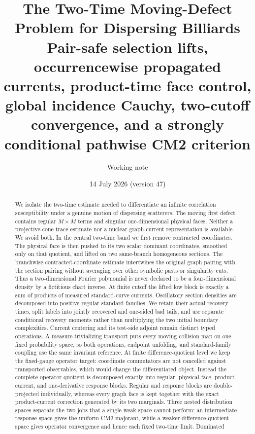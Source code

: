 \documentclass[11pt]{article}
\title{The Two-Time Moving-Defect Problem for Dispersing Billiards\\
\large Pair-safe selection lifts, occurrencewise propagated currents,
product-time face control,
global incidence Cauchy,
two-cutoff convergence, and a strongly conditional
pathwise CM2 criterion}
\author{Working note}
\date{14 July 2026 (version 47)}
\begin{document}
\maketitle

\begin{abstract}\sloppy
We isolate the two-time estimate needed to differentiate an infinite
correlation susceptibility under a genuine motion of dispersing scatterers.
The moving first defect contains regular $M\times M$ terms and singular
one-dimensional physical faces.  Neither a projective-cone trace estimate nor
a nuclear graph-current representation is available.  We avoid both.  In the
central two-time band we first remove contracted coordinates.  The physical
face is then pushed to its two scalar dominant coordinates, smoothed only on
that quotient, and lifted on two same-branch homogeneous sections.  The
branchwise contracted-coordinate estimate intertwines the original graph
pairing with the section pairing without averaging over other symbolic pasts
or singularity cuts.  Thus a two-dimensional Fourier polynomial is never
declared to be a four-dimensional density by a fictitious chart inverse.  At
finite cutoff the lifted low block is exactly a sum of products of measured
standard-curve currents.  Oscillatory section densities are decomposed into
positive regular standard families.  We retain their actual recovery times,
split labels into jointly recovered and one-sided bad tails, and use separate
conditional recovery moments rather than multiplying the two initial boundary
complexities.  Current centering and its test-side adjoint remain
distinct typed operations.  A measure-trivializing transport puts every
moving collision map on one fixed probability space, so both operations,
endpoint unfolding, and standard-family coupling use the same invariant
reference.  At finite difference-quotient level we keep the fixed-gauge
operator target: coordinate commutators are not cancelled against transported
observables, which would change the differentiated object.  Instead the
complete operator quotient is decomposed exactly into regular, physical-face,
product-current, and one-derivative response blocks.  Regular and response
blocks are double-projected individually, whereas every graph face is kept
together with the exact product-current correction generated by its two
marginals.  Three nested distribution spaces separate the two
jobs that a single weak space cannot perform: an intermediate response space
gives the uniform CM2 majorant, while a weaker difference-quotient space gives
operator convergence and hence each fixed two-time limit.  Dominated

\end{abstract}
\end{document}
